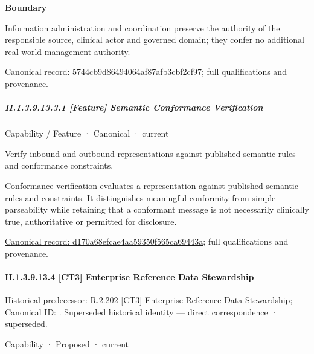 \textbf{Boundary}



Information administration and coordination preserve the authority of the responsible source, clinical actor and governed domain; they confer no additional real-world management authority.


{\footnotesize \href{../../../../continuum/strategy/capability/5744cb9d86494064af87afb3cbf2cf97.md}{Canonical record: 5744cb9d86494064af87afb3cbf2cf97}; full qualifications and provenance.}\par
\subparagraph*{II.1.3.9.13.3.1 [Feature] Semantic Conformance Verification}
\label{navigation:II.1.3.9.13.3.1}

\label{element:d170a68efcae4aa59350f565ca69443a}
{\small Capability / Feature · Canonical · current}\par

Verify inbound and outbound representations against published semantic rules and conformance constraints.



Conformance verification evaluates a representation against published semantic rules and constraints. It distinguishes meaningful conformity from simple parseability while retaining that a conformant message is not necessarily clinically true, authoritative or permitted for disclosure.


{\footnotesize \href{../../../../continuum/strategy/capability/feature/d170a68efcae4aa59350f565ca69443a.md}{Canonical record: d170a68efcae4aa59350f565ca69443a}; full qualifications and provenance.}\par
\paragraph*{II.1.3.9.13.4 [CT3] Enterprise Reference Data Stewardship}
\label{navigation:II.1.3.9.13.4}

{\small Historical predecessor: R.2.202 \hyperref[element:fd9f3239fdb64ea687825b66bb4d1f17]{[CT3] Enterprise Reference Data Stewardship}; Canonical ID: \texttt{}. Superseded historical identity — direct correspondence · superseded.}\par
\label{element:971d4b079ad24e89b70a8ed8dec0c8bf}
{\small Capability · Proposed · current}\par

